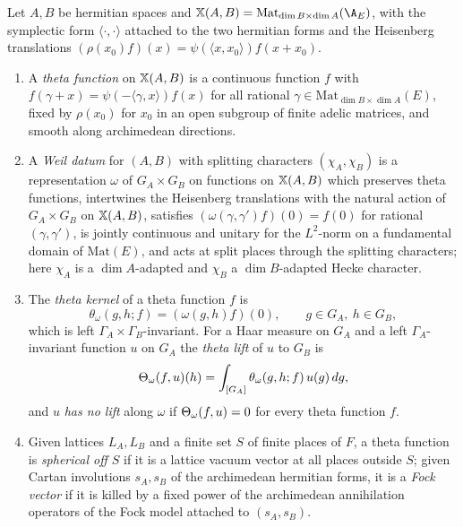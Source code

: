 \begin{definition}\label{pf:liftinj:thetadef}
Let $A,B$ be hermitian spaces and $\liftinjX(A,B)=\mathrm{Mat}_{\dim B\times\dim A}(\A_E)$, with the symplectic form
$\langle\cdot,\cdot\rangle$ attached to the two hermitian forms and the Heisenberg translations
$(\rho(x_0)f)(x)=\psi(\langle x,x_0\rangle)f(x+x_0)$.
\begin{enumerate}[label=(\alph*)]
\item A \emph{theta function} on $\mathbb{X}(A,B)$ is a continuous function $f$ with $f(\gamma+x)=\psi(-\langle\gamma,x\rangle)f(x)$
for all rational $\gamma\in\mathrm{Mat}_{\dim B\times\dim A}(E)$, fixed by $\rho(x_0)$ for $x_0$ in an open subgroup of finite adelic
matrices, and smooth along archimedean directions.
\item A \emph{Weil datum} for $(A,B)$ with splitting characters $(\chi_A,\chi_B)$ is a representation $\omega$ of $G_A\times G_B$ on
functions on $\mathbb{X}(A,B)$ which preserves theta functions, intertwines the Heisenberg translations with the natural action of
$G_A\times G_B$ on $\mathbb{X}(A,B)$, satisfies $(\omega(\gamma,\gamma')f)(0)=f(0)$ for rational $(\gamma,\gamma')$, is jointly continuous
and unitary for the $L^2$-norm on a fundamental domain of $\mathrm{Mat}(E)$, and acts at split places through the splitting
characters; here $\chi_A$ is a $\dim A$-adapted and $\chi_B$ a $\dim B$-adapted Hecke character.
\item The \emph{theta kernel} of a theta function $f$ is
\begin{equation}\label{eq:pf:liftinj:kernel}
\theta_\omega(g,h;f)=(\omega(g,h)f)(0),\qquad g\in G_A,\ h\in G_B,
\end{equation}
which is left $\Gamma_A\times\Gamma_B$-invariant. For a Haar measure on $G_A$ and a left $\Gamma_A$-invariant function $u$ on $G_A$
the \emph{theta lift} of $u$ to $G_B$ is
\begin{equation}\label{eq:pf:liftinj:up}
\Theta_\omega(f,u)(h)=\int_{[G_A]}\theta_\omega(g,h;f)\,u(g)\,dg ,
\end{equation}
and $u$ \emph{has no lift} along $\omega$ if $\Theta_\omega(f,u)=0$ for every theta function $f$.
\item Given lattices $L_A,L_B$ and a finite set $S$ of finite places of $F$, a theta function is \emph{spherical off $S$} if it is a
lattice vacuum vector at all places outside $S$; given Cartan involutions $s_A,s_B$ of the archimedean hermitian forms, it is a
\emph{Fock vector} if it is killed by a fixed power of the archimedean annihilation operators of the Fock model attached to
$(s_A,s_B)$.
\end{enumerate}
\end{definition}

